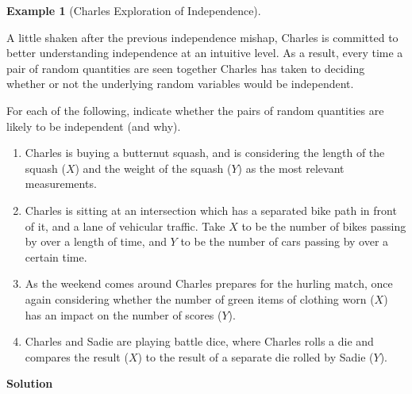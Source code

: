 \documentclass[
  letterpaper,
  DIV=11,
  numbers=noendperiod]{scrreprt}
\providecommand{\tightlist}{%
  \setlength{\itemsep}{0pt}\setlength{\parskip}{0pt}}\usepackage{longtable,booktabs,array}
\theoremstyle{definition}
\theoremstyle{definition}
\theoremstyle{definition}
\newtheorem{example}{Example}[chapter]
\theoremstyle{remark}
\begin{document}
\begin{example}[Charles Exploration of
Independence]\protect\hypertarget{exm-independence-via-pmfs}{}\label{exm-independence-via-pmfs}

A little shaken after the previous independence mishap, Charles is
committed to better understanding independence at an intuitive level. As
a result, every time a pair of random quantities are seen together
Charles has taken to deciding whether or not the underlying random
variables would be independent.

For each of the following, indicate whether the pairs of random
quantities are likely to be independent (and why).

\begin{enumerate}
\def\labelenumi{\alph{enumi}.}
\tightlist
\item
  Charles is buying a butternut squash, and is considering the length of
  the squash (\(X\)) and the weight of the squash (\(Y\)) as the most
  relevant measurements.
\item
  Charles is sitting at an intersection which has a separated bike path
  in front of it, and a lane of vehicular traffic. Take \(X\) to be the
  number of bikes passing by over a length of time, and \(Y\) to be the
  number of cars passing by over a certain time.
\item
  As the weekend comes around Charles prepares for the hurling match,
  once again considering whether the number of green items of clothing
  worn (\(X\)) has an impact on the number of scores (\(Y\)).
\item
  Charles and Sadie are playing battle dice, where Charles rolls a die
  and compares the result (\(X\)) to the result of a separate die rolled
  by Sadie (\(Y\)).
\end{enumerate}

\begin{tcolorbox}[enhanced jigsaw, colback=white, breakable, rightrule=.15mm, leftrule=.75mm, toprule=.15mm, left=2mm, arc=.35mm, opacityback=0, bottomrule=.15mm]

\vspace{-3mm}\textbf{Solution}\vspace{3mm}


\end{tcolorbox}
\end{example}
\end{document}
